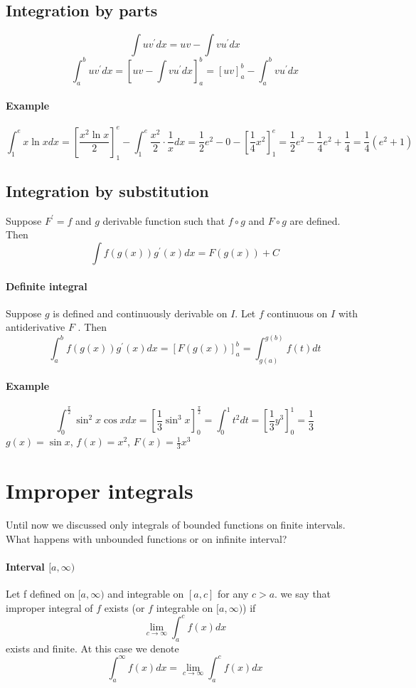 \subsection{Integration by parts}
$$\int uv^\prime dx = uv - \int vu^\prime dx$$
$$\int_a^b uv^\prime dx = \left[ uv - \int vu^\prime dx \right]_a^b = \left[ uv \right]_a^b - \int_a^b vu^\prime dx$$
\paragraph{Example}
$$\int_1^e x \ln x dx = \left[\frac{x^2 \ln x}{2}\right]_1^e - \int_1^e \frac{x^2}{2}\cdot \frac{1}{x} dx = \frac{1}{2}e^2 - 0 - \left[ \frac{1}{4}x^2 \right]_1^e = \frac{1}{2}e^2 - \frac{1}{4}e^2 + \frac{1}{4} = \frac{1}{4} \left( e^2 + 1 \right) $$
\subsection{Integration by substitution}
Suppose $F^\prime = f $ and $g$ derivable function such that $f\circ g$ and $F \circ g$ are defined. Then
$$\int f(g(x)) g^\prime(x) dx = F(g(x)) + C$$
\paragraph{Definite integral}
Suppose $g$ is defined and continuously derivable on $I$. Let $f$ continuous on $I$   with antiderivative $F$ . Then
$$\int_a^b f(g(x)) g^\prime(x) dx = \left[ F(g(x))\right]_a^b = \int_{g(a)}^{g(b)} f(t) dt$$ 
\paragraph{Example}
$$\int_0^{\frac{\pi}{2}} \sin^2 x \cos x dx =\left[ \frac{1}{3} \sin^3 x\right]_0^{\frac{\pi}{2}} = \int_0^1 t^2 dt = \left[ \frac{1}{3} y^3 \right]_0^1 = \frac{1}{3}$$
$g(x) = \sin x$, $f(x) = x^2$, $F(x) = \frac{1}{3} x^3$
\section{Improper integrals}
Until now we discussed only integrals of bounded functions on finite intervals. What happens with unbounded functions or on infinite interval?
\paragraph{Interval $[a, \infty)$}
Let f defined on $[a,\infty)$ and integrable on $[a,c]$ for any $c>a$. we say that improper integral of $f$ exists (or $f$ integrable on  $[a,\infty)$) if $$\lim_{c\to \infty} \int_a^c f(x) dx$$ exists and finite. At this case we denote $$\int_a^\infty f(x) dx = \lim_{c\to \infty} \int_a^c f(x) dx$$
